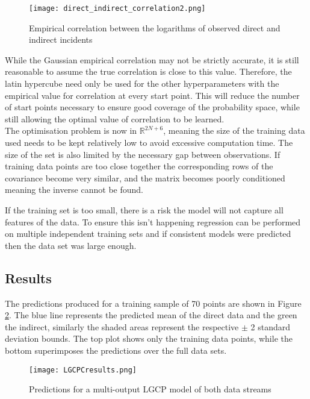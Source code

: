 \documentclass[a4paper,11pt]{report}
\begin{document}
\begin{figure}
\centering
\texttt{[image: direct\_indirect\_correlation2.png]}
\caption{Empirical correlation between the logarithms of observed direct and indirect incidents}
\label{fig:lcorrelation}
\end{figure}

While the Gaussian empirical correlation may not be strictly accurate, it is still reasonable to assume the true correlation is close to this value. Therefore, the latin hypercube need only be used for the other hyperparameters with the empirical value for correlation at every start point. This will reduce the number of start points necessary to ensure good coverage of the probability space, while still allowing the optimal value of correlation to be learned. \\


The optimisation problem is now in \(\mathds{R}^{2N+6}\), meaning the size of the training data used needs to be kept relatively low to avoid excessive computation time. The size of the set is also limited by the necessary gap between observations. If training data points are too close together the corresponding rows of the covariance become very similar, and the matrix becomes poorly conditioned meaning the inverse cannot be found. \par

If the training set is too small, there is a risk the model will not capture all features of the data. To ensure this isn't happening regression can be performed on multiple independent training sets and if consistent models were predicted then the data set was large enough.


\subsection{Results}
The predictions produced for a training sample of 70 points are shown in Figure \ref{fig:LGCPCresults}. The blue line represents the predicted mean of the direct data and the green the indirect, similarly the shaded areas represent the respective \(\pm\) 2 standard deviation bounds. The top plot shows only the training data points, while the bottom superimposes the predictions over the full data sets. \par

\begin{figure}
\centering
\texttt{[image: LGCPCresults.png]}
\caption{Predictions for a multi-output LGCP model of both data streams}
\label{fig:LGCPCresults}
\end{figure}
\end{document}
